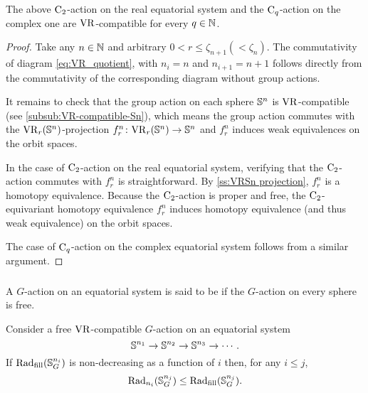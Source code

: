 \lemma The above \(\mathrm{C}_2\)-action on the real equatorial system and the \(\mathrm{C}_q\)-action on the complex one are \(\mathrm{VR}\)-compatible for every \(q \in \mathbb{N}\).

\begin{proof}
    Take any $n \in \mathbb{N}$ and arbitrary $0 < r \leq \zeta_{n+1} (< \zeta_{n})$.
    The commutativity of diagram \ref{eq:VR_quotient}, with $n_i = n$ and $n_{i+1} = n+1$ follows directly from the commutativity of the corresponding diagram without group actions.

    It remains to check that the group action on each sphere $\mathbb{S}^n$ is \(\mathrm{VR}\)-compatible (see \cref{subsub:VR-compatible-Sn}), which means the group action commutes with the $\mathrm{VR}_r(\mathbb{S}^{n})$-projection $f_r^{n}\colon \mathrm{VR}_r(\mathbb{S}^{n}) \to \mathbb{S}^{n}$ and $f_r^{n}$ induces weak equivalences on the orbit spaces.

    In the case of $\mathrm{C}_2$-action on the real equatorial system, verifying that the $\mathrm{C}_2$-action commutes with $f_r^{n}$ is straightforward.
    By \cref{ss:VRSn projection}, $f_r^{n}$ is a homotopy equivalence.
    Because the $\mathrm{C}_2$-action is proper and free, the $\mathrm{C}_2$-equivariant homotopy equivalence $f_r^n$ induces homotopy equivalence (and thus weak equivalence) on the orbit spaces.

    The case of $\mathrm{C}_q$-action on the complex equatorial system follows from a similar argument.
\end{proof}

\subsubsection{}\label{ss:fundamental_lemma}

A \(G\)-action on an equatorial system is said to be  if the \(G\)-action on every sphere is free.

\medskip\lemma Consider a free $\mathrm{VR}$-compatible $G$-action on an equatorial system
\[
\mathbb{S}^{n_1} \to \mathbb{S}^{n_2} \to \mathbb{S}^{n_3} \to \dotsb.
\]
If $\mathrm{Rad}_{\mathrm{fill}}(\mathbb{S}^{n_i}_G)$ is non-decreasing as a function of \(i\) then, for any \(i \leq j\),
\[
\mathrm{Rad}_{n_i}(\mathbb{S}^{n_j}_G) \leq \mathrm{Rad}_{\mathrm{fill}}(\mathbb{S}^{n_j}_G).
\]

